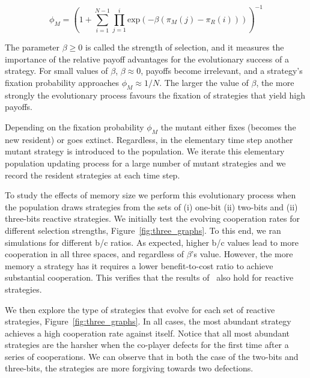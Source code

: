 \documentclass{article}
\theoremstyle{definition}
\begin{document}
\begin{equation}\label{eq:fixation_probability}
  \phi_{M} = \left(1 + \sum_{i=1}^{N - 1} \prod_{j=1}^{i} \text{exp} (- \beta (\pi_{M}(j) - \pi_{R}(i))) \right)^{-1}
\end{equation}

The parameter \(\beta \geq 0\) is called the strength of selection, and it
measures the importance of the relative payoff advantages for the
evolutionary success of a strategy. For small values of \(\beta\), \(\beta
\approx 0\), payoffs become irrelevant, and a strategy's fixation probability
approaches \(\phi_{M} \approx 1 / N\). The larger the value of \(\beta\), the
more strongly the evolutionary process favours the fixation of strategies that
yield high payoffs.

Depending on the fixation probability \(\phi_{M}\) the mutant either fixes
(becomes the new resident) or goes extinct. Regardless, in the elementary time
step another mutant strategy is introduced to the  population. We iterate this
elementary population updating process for a large number of mutant strategies
and we record the resident strategies at each time step.

To study the effects of memory size we perform this evolutionary process when
the population draws strategies from the sets of (i) one-bit (ii) two-bits and
(ii) three-bits reactive strategies. We initially test the evolving cooperation
rates for different selection strengths, Figure~\ref{fig:three_graphs}. To this end, we ran simulations for
different b/c ratios. As expected, higher b/c values lead to more cooperation in
all three spaces, and regardless of \(\beta\)'s value. However, the more memory
a strategy has it requires a lower benefit-to-cost ratio to achieve substantial
cooperation. This verifies that the results of~\citep{hilbe:PNAS:2017} also
hold for reactive strategies.

We then explore the type of strategies that evolve for each set of reactive
strategies, Figure~\ref{fig:three_graphs}. In all cases, the most abundant
strategy achieves a high cooperation rate against itself. Notice that
all most abundant strategies are the harsher when the co-player defects
for the first time after a series of cooperations. We can observe that in
both the case of the two-bits and three-bits, the strategies are more forgiving
towards two defections.
\end{document}
